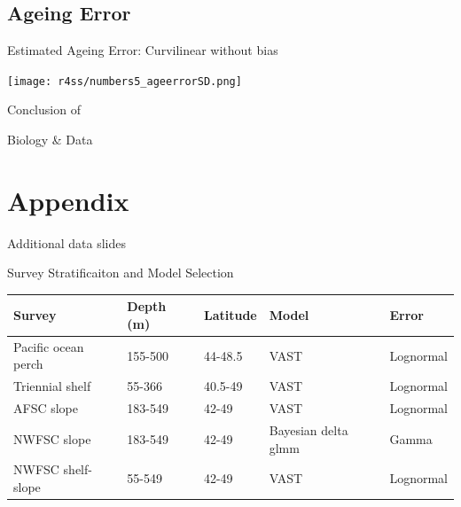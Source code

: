 \documentclass[pdf]{beamer}\usepackage[]{graphicx}\usepackage[]{color}
\begin{document}
\subsection{Ageing Error}
\begin{frame}{Estimated Ageing Error: Curvilinear without bias}
  \begin{center}
    \texttt{[image: r4ss/numbers5\_ageerrorSD.png]}
  \end{center}
\end{frame}

\begin{frame}
  \Huge{\centerline{Conclusion of}}
  \Huge{\centerline{Biology \& Data}}
\end{frame}

\section*{Appendix}
\begin{frame}
  \Huge{\centerline{Additional data slides}}
\end{frame}

\begin{frame}{Survey Stratificaiton and Model Selection}
  \begin{table}[ht]
  \small
  \centering
  \begin{tabular}{p{1.15in}p{0.65in}p{0.5in}p{0.5in}p{0.75in}}
  Survey & Depth (m) & Latitude & Model & Error  \\ 
  \hline
  Pacific ocean perch & 155-500 & 44-48.5 & VAST & Lognormal \\
  Triennial shelf & 55-366 & 40.5-49 & VAST & Lognormal\\ 
  AFSC slope & 183-549 & 42-49 & VAST & Lognormal \\ 
  NWFSC slope & 183-549 & 42-49 & Bayesian delta glmm & Gamma \\
  NWFSC shelf-slope & 55-549 & 42-49 & VAST & Lognormal \\
  \hline
  \end{tabular}
  \end{table}
\end{frame}
\end{document}
